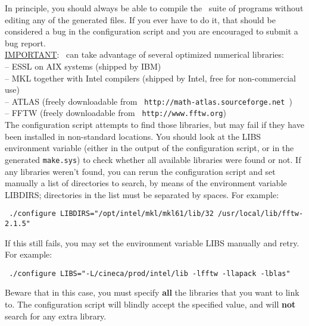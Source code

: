 \documentclass[11pt]{article}
\begin{document}
\noindent In principle, you should always be able to compile the \SAX\ suite of
programs without editing any of the generated files.  If
you ever have to do it, that should be considered a bug in the
configuration script and you are encouraged to submit a bug
report.\\

\noindent \underline {IMPORTANT}: \SAX\ can take advantage of
several
optimized numerical libraries:\\
\noindent -- ESSL on AIX systems (shipped by IBM)\\
\noindent -- MKL together with Intel compilers (shipped by Intel,
free for non-commercial use)\\
\noindent -- ATLAS (freely downloadable from
   \texttt{ http://math-atlas.sourceforge.net })\\
\noindent -- FFTW (freely downloadable from
   \texttt{ http://www.fftw.org})\\

\noindent The configuration script attempts to find those
libraries, but may fail if they have been installed in
non-standard locations. You should look at the LIBS environment
variable (either in the output of the configuration script, or in
the generated {\tt make.sys}) to check whether all available
libraries were found or not.
If any libraries weren't found, you can rerun the
configuration script and set manually a list of directories to search,
by means of the environment variable LIBDIRS; directories in the
list must be
separated by spaces.  For example:
%
%
\begin{description}
  \item \texttt{ ./configure LIBDIRS="/opt/intel/mkl/mkl61/lib/32
  /usr/local/lib/fftw-2.1.5" }
\end{description}
%
%

\noindent If this still fails, you may set the environment
variable LIBS manually and retry.  For example:
%
%
\begin{description}
  \item \texttt{ ./configure LIBS="-L/cineca/prod/intel/lib -lfftw -llapack
  -lblas" }
\end{description}
%
%

\noindent Beware that in this case, you must specify \textbf{all} the
libraries that you want to link to.  The configuration script will
blindly accept the specified value, and will \textbf{not} search for any
extra library.\\
\end{document}
